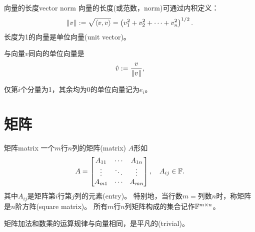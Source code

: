 \begin{definition}{向量的长度}{vector norm}
	向量的长度(或范数，norm)可通过内积定义：
	\begin{equation}
		\left\lVert v\right\rVert:=\sqrt{\left\langle v,v\right\rangle}=\left(v_1^2+v_2^2+\cdots+v_n^2\right)^{1/2}.
	\end{equation}
	长度为1的向量是单位向量(unit vector)。
\end{definition}
\begin{corollary}
	与向量$v$同向的单位向量是
	\begin{equation}
		\hat v:=\frac{v}{\left\lVert v\right\rVert},
	\end{equation}
\end{corollary}
\begin{remark}
	仅第$i$个分量为1，其余均为0的单位向量记为$e_i$。
\end{remark}


\section{矩阵}
\begin{definition}{矩阵}{matrix}
    一个$m$行$n$列的矩阵(matrix) $A$形如
    \[
        A=\begin{bmatrix}
            A_{11}&\cdots&A_{1n}\\
            \vdots&\ddots&\vdots\\
            A_{m1}&\cdots&A_{mn}
        \end{bmatrix},\quad A_{ij}\in\mathbb F.
    \]
    其中$A_{ij}$是矩阵第$i$行第$j$列的元素(entry)。
	特别地，当行数$m=$列数$n$时，称矩阵是$n$阶方阵(square matrix)。
    \tcblower
	所有$m$行$n$列矩阵构成的集合记作$\mathbb F^{m\times n}$。
\end{definition}

矩阵加法和数乘的运算规律与向量相同，是平凡的(trivial)。

